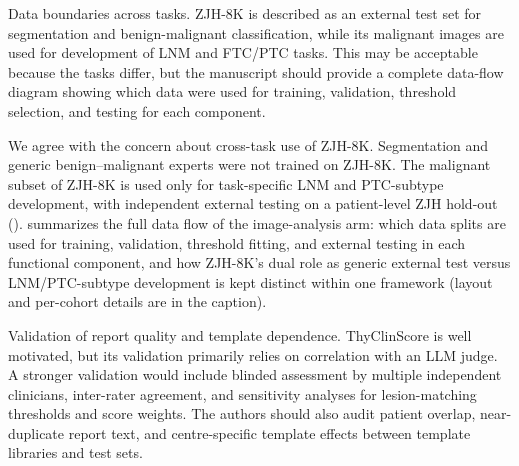 \label{rev:R1.4}
\begin{reviewercomment}
Data boundaries across tasks. ZJH-8K is described as an external test set for segmentation and benign-malignant classification, while its malignant images are used for development of LNM and FTC/PTC tasks. This may be acceptable because the tasks differ, but the manuscript should provide a complete data-flow diagram showing which data were used for training, validation, threshold selection, and testing for each component.
\end{reviewercomment}
\begin{authorresponse}
We agree with the concern about cross-task use of ZJH-8K. Segmentation and generic benign–malignant experts were not trained on ZJH-8K. The malignant subset of ZJH-8K is used only for task-specific LNM and PTC-subtype development, with independent external testing on a patient-level ZJH hold-out ().  summarizes the full data flow of the image-analysis arm: which data splits are used for training, validation, threshold fitting, and external testing in each functional component, and how ZJH-8K's dual role as generic external test versus LNM/PTC-subtype development is kept distinct within one framework (layout and per-cohort details are in the caption).\par
\par

\end{authorresponse}



\label{rev:R1.5}
\begin{reviewercomment}
Validation of report quality and template dependence. ThyClinScore is well motivated, but its validation primarily relies on correlation with an LLM judge. A stronger validation would include blinded assessment by multiple independent clinicians, inter-rater agreement, and sensitivity analyses for lesion-matching thresholds and score weights. The authors should also audit patient overlap, near-duplicate report text, and centre-specific template effects between template libraries and test sets.
\end{reviewercomment}
\begin{authorresponse}

\end{authorresponse}







